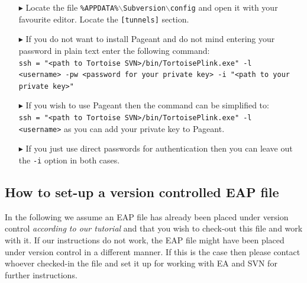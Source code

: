 \begin{enumerate}
  \item[$\blacktriangleright$] Locate the file \texttt{\%APPDATA\%$\backslash$Subversion$\backslash$config} and open it with your favourite editor. Locate the \texttt{[tunnels]} section.
  \item[$\blacktriangleright$] If you do not want to install Pageant and do not mind entering your password in plain text enter the following command:\\
  \texttt{ssh = "<path to Tortoise SVN>/bin/TortoisePlink.exe" -l \\<username> -pw <password for your private key> -i "<path to your private key>"}
  \item[$\blacktriangleright$] If you wish to use Pageant then the command can be simplified to:\\ \texttt{ssh = "<path to Tortoise SVN>/bin/TortoisePlink.exe" -l \\<username>} as you can add your private key to Pageant.
  \item[$\blacktriangleright$] If you just use direct passwords for authentication then you can leave out the \texttt{-i} option in both cases.
\end{enumerate}

\subsection{How to set-up a version controlled EAP file}
In the following we assume an EAP file has already been placed under version control \emph{according to our tutorial} and that you wish to check-out this file and work with it.
If our instructions do not work, the EAP file might have been placed under version control in a different manner.
If this is the case then please contact whoever checked-in the file and set it up for working with EA and SVN for further instructions.

